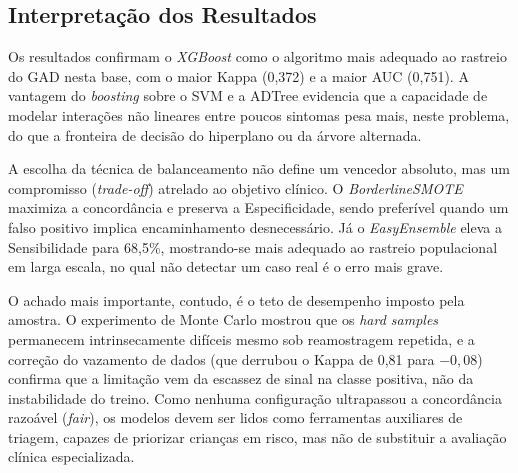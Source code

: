 \subsection{Interpretação dos Resultados}
\label{subsec:interpretacao_resultados}

Os resultados confirmam o \textit{XGBoost} como o algoritmo mais adequado ao
rastreio do GAD nesta base, com o maior Kappa (0,372) e a maior AUC (0,751).
A vantagem do \textit{boosting} sobre o SVM e a ADTree evidencia que a
capacidade de modelar interações não lineares entre poucos sintomas pesa mais,
neste problema, do que a fronteira de decisão do hiperplano ou da árvore
alternada.

A escolha da técnica de balanceamento não define um vencedor absoluto, mas um
compromisso (\textit{trade-off}) atrelado ao objetivo clínico. O
\textit{BorderlineSMOTE} maximiza a concordância e preserva a Especificidade,
sendo preferível quando um falso positivo implica encaminhamento desnecessário.
Já o \textit{EasyEnsemble} eleva a Sensibilidade para 68,5\%, mostrando-se mais
adequado ao rastreio populacional em larga escala, no qual não detectar um caso
real é o erro mais grave.

O achado mais importante, contudo, é o teto de desempenho imposto pela amostra.
O experimento de Monte Carlo mostrou que os \textit{hard samples} permanecem
intrinsecamente difíceis mesmo sob reamostragem repetida, e a correção do
vazamento de dados (que derrubou o Kappa de 0,81 para $-0,08$) confirma que a
limitação vem da escassez de sinal na classe positiva, não da instabilidade do
treino. Como nenhuma configuração ultrapassou a concordância razoável
(\textit{fair}), os modelos devem ser lidos como ferramentas auxiliares de
triagem, capazes de priorizar crianças em risco, mas não de substituir a
avaliação clínica especializada.
